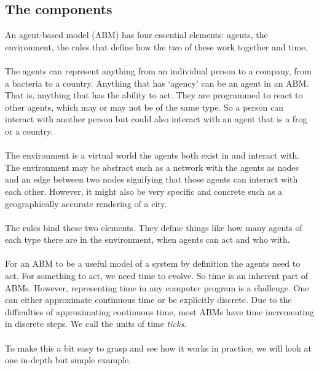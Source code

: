 \subsection{The components}
An agent-based model (ABM) has four essential elements: agents, the environment, the rules that define how the two of these work together and time.\\
\\
The agents can represent anything from an individual person to a company, from a bacteria to a country. Anything that has `agency' can be an agent in an ABM. That is, anything that has the ability to act. They are programmed to react to other agents, which may or may not be of the same type. So a person can interact with another person but could also interact with an agent that is a frog or a country.\\
\\
The environment is a virtual world the agents both exist in and interact with\cite{abm-gilbert}. The environment may be abstract such as a network with the agents as nodes and an edge between two nodes signifying that those agents can interact with each other. However, it might also be very specific and concrete such as a geographically accurate rendering of a city.\\
\\
The rules bind these two elements. They define things like how many agents of each type there are in the environment, when agents can act and who with.\\
\\
For an ABM to be a useful model of a system by definition the agents need to act. For something to act, we need time to evolve. So time is an inherent part of ABMs. However, representing time in any computer program is a challenge. One can either approximate continuous time or be explicitly discrete. Due to the difficulties of approximating continuous time, most ABMs have time incrementing in discrete steps. We call the units of time \textit{ticks}.\\
\\
To make this a bit easy to grasp and see how it works in practice, we will look at one in-depth but simple example.

